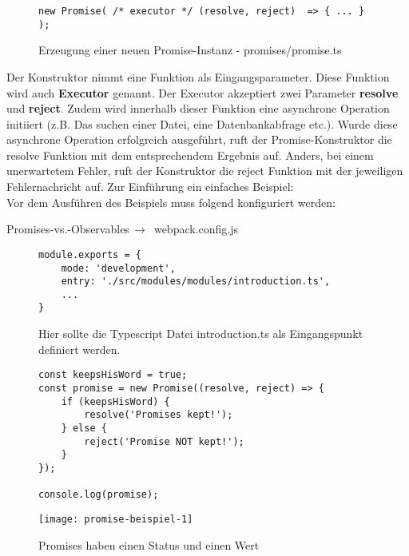 \begin{figure}[h!]
\begin{lstlisting}
new Promise( /* executor */ (resolve, reject)  => { ... } );
\end{lstlisting}
\caption{Erzeugung einer neuen Promise-Instanz - promises/promise.ts}
\end{figure}

Der Konstruktor nimmt eine Funktion als Eingangsparameter. Diese Funktion wird auch \textbf{Executor} genannt.\cite{promise-executor} Der Executor akzeptiert zwei Parameter \textbf{resolve} und \textbf{reject}.
Zudem wird innerhalb dieser Funktion eine asynchrone Operation initiiert (z.B. Das suchen einer Datei, eine Datenbankabfrage etc.). Wurde diese asynchrone Operation erfolgreich ausgeführt, ruft der Promise-Konstruktor die resolve Funktion mit dem entsprechendem Ergebnis auf. Anders, bei einem unerwartetem Fehler, ruft der Konstruktor die reject Funktion mit der jeweiligen Fehlernachricht auf. Zur Einführung ein einfaches Beispiel:\\

\noindent
Vor dem Ausführen des Beispiels muss folgend konfiguriert werden:
 \begin{center}
     Promises-vs.-Observables$\,\to\,$ webpack.config.js
 \end{center}

\begin{figure}[h!]
\begin{lstlisting}
module.exports = {
    mode: 'development',
    entry: './src/modules/modules/introduction.ts',
    ...
}
\end{lstlisting}
\caption{Hier sollte die Typescript Datei introduction.ts als Eingangspunkt definiert werden.}
\end{figure}


\begin{figure}[h!]
\begin{lstlisting}
const keepsHisWord = true;
const promise = new Promise((resolve, reject) => {
    if (keepsHisWord) {
        resolve('Promises kept!');
    } else {
        reject('Promise NOT kept!');
    }
});

console.log(promise);
\end{lstlisting}
\end{figure}


\begin{figure}[H]
\centering
\texttt{[image: promise-beispiel-1]}
\caption{Promises haben einen Status und einen Wert}
\end{figure}

